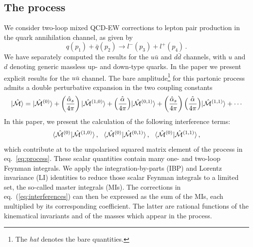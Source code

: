 \documentclass[11pt,a4paper]{article}
\begin{document}
\subsection{The process}
We consider two-loop mixed QCD-EW corrections to lepton pair production in the quark annihilation channel, as given by
\begin{equation}
 q(p_1) + \bar{q}(p_2) \rightarrow l^{-}(p_3) + l^{+} (p_4) \,.
\label{eq:process}
\end{equation}
      We have separately computed the results for the $u\bar u$ and $d\bar d$ channels,
      with $u$ and $d$ denoting generic massless up- and down-type quarks.
      In the paper we present explicit results for the $u\bar u$ channel.
%
The bare amplitude\footnote{The \textit{hat} denotes the bare quantities.}
for this partonic process admits a double perturbative expansion in the two coupling constants
\begin{align}
 |\hat{\cal M} \rangle = |\hat{\cal M}^{(0)} \rangle + \left( \frac{\hat\alpha_s}{4 \pi} \right) |\hat{\cal M}^{(1,0)} \rangle + \hat{\left( \frac{\alpha}{4 \pi} \right)} |\hat{\cal M}^{(0,1)} \rangle + \left( \frac{\hat\alpha_s}{4 \pi} \right) \hat{\left( \frac{\alpha}{4 \pi} \right)} |\hat{\cal M}^{(1,1)} \rangle + \cdots
\end{align}
%
In this paper, we present the calculation of the following interference terms:
\begin{equation}
  \langle \hat{\cal M}^{(0)} | \hat{\cal M}^{(1,0)} \rangle \,, ~~
  \langle \hat{\cal M}^{(0)} | \hat{\cal M}^{(0,1)} \rangle \,, ~~
  \langle \hat{\cal M}^{(0)} | \hat{\cal M}^{(1,1)} \rangle \,,
  \label{eq:interferences}
\end{equation}
which contribute at \oaas to the unpolarised squared matrix element
of the process in eq.~\eqref{eq:process}.
These scalar quantities contain many one- and two-loop Feynman integrals.
We apply the
integration-by-parts (IBP) \cite{Tkachov:1981wb,Chetyrkin:1981qh} and
Lorentz invariance (LI) \cite{Gehrmann:1999as} identities
to reduce those scalar Feynman integrals to a limited set, the so-called master integrals (MIs).
The corrections in eq.~(\ref{eq:interferences}) can then be expressed as the sum of the MIs, each
multiplied by its corresponding coefficient.
The latter are rational functions of the kinematical invariants
and of the masses which appear in the process.
\end{document}
